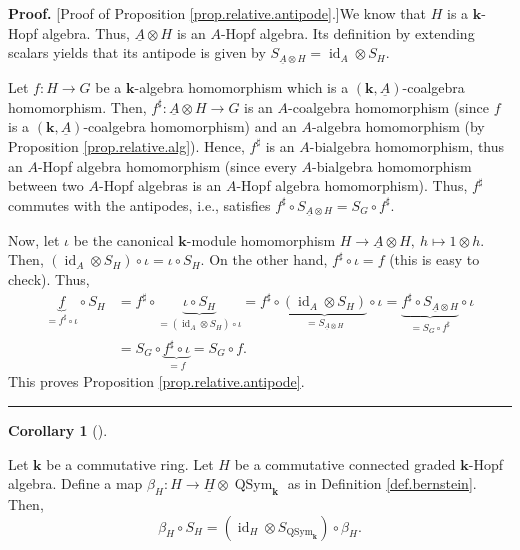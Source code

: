 \documentclass
[numbers=enddot,12pt,final,onecolumn,notitlepage,abstracton]{scrartcl}%
\theoremstyle{definition}
\newtheorem{coro}[theo]{Corollary}
\newenvironment{corollary}[1][]
{\begin{coro}[#1]\begin{leftbar}}
{\end{leftbar}\end{coro}}
\newenvironment{proof}[1][Proof]{\noindent\textbf{#1.} }{\ \rule{0.5em}{0.5em}}
\begin{document}
\begin{proof}
[Proof of Proposition \ref{prop.relative.antipode}.]We know that $H$ is a
$\mathbf{k}$-Hopf algebra. Thus, $\underline{A}\otimes H$ is an $A$-Hopf
algebra. Its definition by extending scalars yields that its antipode is given
by $S_{\underline{A}\otimes H}=\operatorname*{id}\nolimits_{A}\otimes S_{H}$.

Let $f:H\rightarrow G$ be a $\mathbf{k}$-algebra homomorphism which is a
$\left(  \mathbf{k},\underline{A}\right)  $-coalgebra homomorphism. Then,
$f^{\sharp}:\underline{A}\otimes H\rightarrow G$ is an $A$-coalgebra
homomorphism (since $f$ is a $\left(  \mathbf{k},\underline{A}\right)
$-coalgebra homomorphism) and an $A$-algebra homomorphism (by Proposition
\ref{prop.relative.alg}). Hence, $f^{\sharp}$ is an $A$-bialgebra
homomorphism, thus an $A$-Hopf algebra homomorphism (since every $A$-bialgebra
homomorphism between two $A$-Hopf algebras is an $A$-Hopf algebra
homomorphism). Thus, $f^{\sharp}$ commutes with the antipodes, i.e., satisfies
$f^{\sharp}\circ S_{\underline{A}\otimes H}=S_{G}\circ f^{\sharp}$.

Now, let $\iota$ be the canonical $\mathbf{k}$-module homomorphism
$H\rightarrow\underline{A}\otimes H,\ h\mapsto1\otimes h$. Then, $\left(
\operatorname*{id}\nolimits_{A}\otimes S_{H}\right)  \circ\iota=\iota\circ
S_{H}$. On the other hand, $f^{\sharp}\circ\iota=f$ (this is easy to check).
Thus,%
\begin{align*}
\underbrace{f}_{=f^{\sharp}\circ\iota}\circ S_{H}  &  =f^{\sharp}%
\circ\underbrace{\iota\circ S_{H}}_{=\left(  \operatorname*{id}\nolimits_{A}%
\otimes S_{H}\right)  \circ\iota}=f^{\sharp}\circ\underbrace{\left(
\operatorname*{id}\nolimits_{A}\otimes S_{H}\right)  }_{=S_{\underline{A}%
\otimes H}}\circ\iota=\underbrace{f^{\sharp}\circ S_{\underline{A}\otimes H}%
}_{=S_{G}\circ f^{\sharp}}\circ\iota\\
&  =S_{G}\circ\underbrace{f^{\sharp}\circ\iota}_{=f}=S_{G}\circ f.
\end{align*}
This proves Proposition \ref{prop.relative.antipode}.
\end{proof}

\begin{corollary}
\label{cor.QSym.bernstein.antipode}Let $\mathbf{k}$ be a commutative ring. Let
$H$ be a commutative connected graded $\mathbf{k}$-Hopf algebra. Define a map
$\beta_{H}:H\rightarrow\underline{H}\otimes\operatorname*{QSym}%
\nolimits_{\mathbf{k}}$ as in Definition \ref{def.bernstein}. Then,%
\[
\beta_{H}\circ S_{H}=\left(  \operatorname*{id}\nolimits_{H}\otimes
S_{\operatorname*{QSym}\nolimits_{\mathbf{k}}}\right)  \circ\beta_{H}.
\]

\end{corollary}
\end{document}
